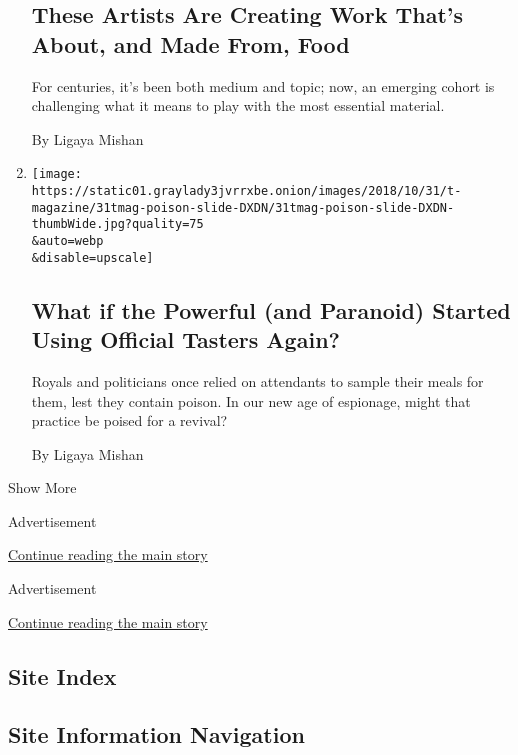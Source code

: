 \begin{enumerate}
  \hypertarget{these-artists-are-creating-work-thats-about-and-made-from-food}{%
  \subsection{These Artists Are Creating Work That's About, and Made
  From,
  Food}\label{these-artists-are-creating-work-thats-about-and-made-from-food}}

  For centuries, it's been both medium and topic; now, an emerging
  cohort is challenging what it means to play with the most essential
  material.

  By Ligaya Mishan
\item
  \href{/2018/10/31/t-magazine/food-taster-poison.html}{}

  \texttt{[image: https://static01.graylady3jvrrxbe.onion/images/2018/10/31/t-magazine/31tmag-poison-slide-DXDN/31tmag-poison-slide-DXDN-thumbWide.jpg?quality=75\\\&auto=webp\\\&disable=upscale]}

  \hypertarget{what-if-the-powerful-and-paranoid-started-using-official-tasters-again}{%
  \subsection{What if the Powerful (and Paranoid) Started Using Official
  Tasters
  Again?}\label{what-if-the-powerful-and-paranoid-started-using-official-tasters-again}}

  Royals and politicians once relied on attendants to sample their meals
  for them, lest they contain poison. In our new age of espionage, might
  that practice be poised for a revival?

  By Ligaya Mishan
\end{enumerate}

Show More

Advertisement

\protect\hyperlink{after-mid1}{Continue reading the main story}

Advertisement

\protect\hyperlink{after-mktg}{Continue reading the main story}

\hypertarget{site-index}{%
\subsection{Site Index}\label{site-index}}

\hypertarget{site-information-navigation}{%
\subsection{Site Information
Navigation}\label{site-information-navigation}}

